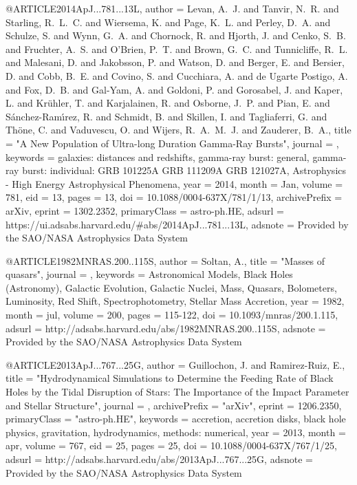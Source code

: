 \documentclass[twocolumn,tighten]{aastex63}
\begin{document}
{{{{@ARTICLE{2014ApJ...781...13L,
       author = {{Levan}, A.~J. and {Tanvir}, N.~R. and {Starling}, R.~L.~C. and
        {Wiersema}, K. and {Page}, K.~L. and {Perley}, D.~A. and
        {Schulze}, S. and {Wynn}, G.~A. and {Chornock}, R. and {Hjorth},
        J. and {Cenko}, S.~B. and {Fruchter}, A.~S. and {O'Brien}, P.~T.
        and {Brown}, G.~C. and {Tunnicliffe}, R.~L. and {Malesani}, D.
        and {Jakobsson}, P. and {Watson}, D. and {Berger}, E. and
        {Bersier}, D. and {Cobb}, B.~E. and {Covino}, S. and
        {Cucchiara}, A. and {de Ugarte Postigo}, A. and {Fox}, D.~B. and
        {Gal-Yam}, A. and {Goldoni}, P. and {Gorosabel}, J. and {Kaper},
        L. and {Kr{\"u}hler}, T. and {Karjalainen}, R. and {Osborne},
        J.~P. and {Pian}, E. and {S{\'a}nchez-Ram{\'\i}rez}, R. and
        {Schmidt}, B. and {Skillen}, I. and {Tagliaferri}, G. and
        {Th{\"o}ne}, C. and {Vaduvescu}, O. and {Wijers}, R.~A.~M.~J.
        and {Zauderer}, B.~A.},
        title = "{A New Population of Ultra-long Duration Gamma-Ray Bursts}",
      journal = {\apj},
     keywords = {galaxies: distances and redshifts, gamma-ray burst: general, gamma-ray burst: individual: GRB 101225A GRB 111209A GRB 121027A, Astrophysics - High Energy Astrophysical Phenomena},
         year = 2014,
        month = Jan,
       volume = {781},
          eid = {13},
        pages = {13},
          doi = {10.1088/0004-637X/781/1/13},
archivePrefix = {arXiv},
       eprint = {1302.2352},
 primaryClass = {astro-ph.HE},
       adsurl = {https://ui.adsabs.harvard.edu/\#abs/2014ApJ...781...13L},
      adsnote = {Provided by the SAO/NASA Astrophysics Data System}
}



@ARTICLE{1982MNRAS.200..115S,
   author = {{Soltan}, A.},
    title = "{Masses of quasars}",
  journal = {\mnras},
 keywords = {Astronomical Models, Black Holes (Astronomy), Galactic Evolution, Galactic Nuclei, Mass, Quasars, Bolometers, Luminosity, Red Shift, Spectrophotometry, Stellar Mass Accretion},
     year = 1982,
    month = jul,
   volume = 200,
    pages = {115-122},
      doi = {10.1093/mnras/200.1.115},
   adsurl = {http://adsabs.harvard.edu/abs/1982MNRAS.200..115S},
  adsnote = {Provided by the SAO/NASA Astrophysics Data System}
}

@ARTICLE{2013ApJ...767...25G,
   author = {{Guillochon}, J. and {Ramirez-Ruiz}, E.},
    title = "{Hydrodynamical Simulations to Determine the Feeding Rate of Black Holes by the Tidal Disruption of Stars: The Importance of the Impact Parameter and Stellar Structure}",
  journal = {\apj},
archivePrefix = "arXiv",
   eprint = {1206.2350},
 primaryClass = "astro-ph.HE",
 keywords = {accretion, accretion disks, black hole physics, gravitation, hydrodynamics, methods: numerical},
     year = 2013,
    month = apr,
   volume = 767,
      eid = {25},
    pages = {25},
      doi = {10.1088/0004-637X/767/1/25},
   adsurl = {http://adsabs.harvard.edu/abs/2013ApJ...767...25G},
  adsnote = {Provided by the SAO/NASA Astrophysics Data System}
}

}}}}
\end{document}
